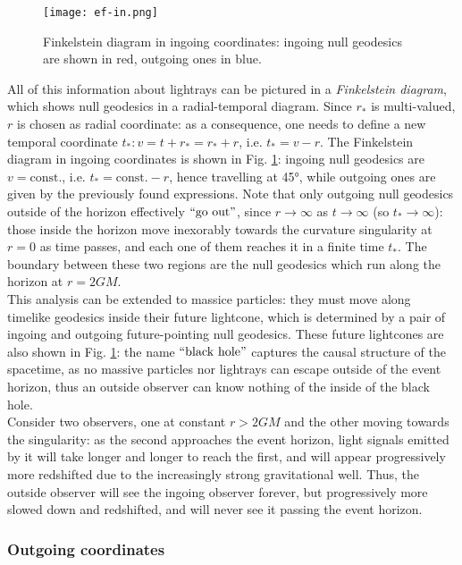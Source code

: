 \begin{figure}
  \centering
  \texttt{[image: ef-in.png]}
  \caption{Finkelstein diagram in ingoing coordinates: ingoing null geodesics are shown in red, outgoing ones in blue.}
  \label{ef-in}
\end{figure}

All of this information about lightrays can be pictured in a \textit{Finkelstein diagram}, which shows null geodesics in a radial-temporal diagram. Since $ r_* $ is multi-valued, $ r $ is chosen as radial coordinate: as a consequence, one needs to define a new temporal coordinate $ t_* : v = t + r_* = r_* + r $, i.e. $ t_* = v - r $. The Finkelstein diagram in ingoing coordinates is shown in Fig. \ref{ef-in}: ingoing null geodesics are $ v = \text{const.} $, i.e. $ t_* = \text{const.} - r $, hence travelling at 45°, while outgoing ones are given by the previously found expressions. Note that only outgoing null geodesics outside of the horizon effectively $ ``\text{go out}" $, since $ r \rightarrow \infty $ as $ t \rightarrow \infty $ (so $ t_* \rightarrow \infty $): those inside the horizon move inexorably towards the curvature singularity at $ r = 0 $ as time passes, and each one of them reaches it in a finite time $ t_* $. The boundary between these two regions are the null geodesics which run along the horizon at $ r = 2GM $.\\
This analysis can be extended to massice particles: they must move along timelike geodesics inside their future lightcone, which is determined by a pair of ingoing and outgoing future-pointing null geodesics. These future lightcones are also shown in Fig. \ref{ef-in}: the name $ ``\text{black hole}" $ captures the causal structure of the spacetime, as no massive particles nor lightrays can escape outside of the event horizon, thus an outside observer can know nothing of the inside of the black hole.\\
Consider two observers, one at constant $ r > 2GM $ and the other moving towards the singularity: as the second approaches the event horizon, light signals emitted by it will take longer and longer to reach the first, and will appear progressively more redshifted due to the increasingly strong gravitational well. Thus, the outside observer will see the ingoing observer forever, but progressively more slowed down and redshifted, and will never see it passing the event horizon.

\subsubsection{Outgoing coordinates}

